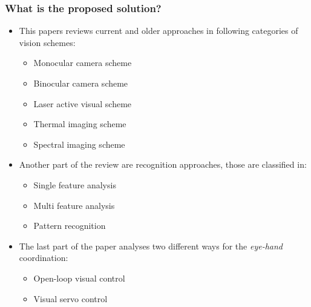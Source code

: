     \subsubsection*{What is the proposed solution?}
    \begin{itemize}
        \item This papers reviews current and older approaches in following categories of vision schemes:
        \begin{itemize}
            \item Monocular camera scheme
            \item Binocular camera scheme
            \item Laser active visual scheme
            \item Thermal imaging scheme
            \item Spectral imaging scheme
        \end{itemize} 
        \item Another part of the review are recognition approaches, those are classified in:
        \begin{itemize}
            \item Single feature analysis
            \item Multi feature analysis
            \item Pattern recognition 
        \end{itemize}
        \item The last part of the paper analyses two different ways for the \emph{eye-hand} coordination:
        \begin{itemize}
            \item Open-loop visual control
            \item Visual servo control
        \end{itemize} 
    \end{itemize}
